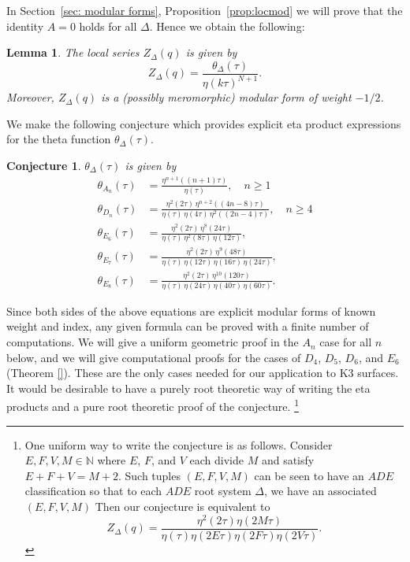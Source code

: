 \documentclass{article}
\newtheorem{conjecture}[theorem]{Conjecture}
\newtheorem{lemma}[theorem]{Lemma}
\theoremstyle{definition}
\newcommand{\NN} {{\mathbb N}}		%
\begin{document}
In Section~\ref{sec: modular forms}, Proposition~\ref{prop:locmod} we will prove that the identity $A=0$ holds
for all $\Delta$. Hence we obtain the following:
\begin{lemma}\label{lem: local series as theta/eta} The local series
$Z_{\Delta}(q)$ is given by
\[
Z_{\Delta}(q) = \frac{\theta_{\Delta}(\tau )}{\eta (k\tau )^{N+1}}. 
\]
Moreover, $Z_{\Delta}(q)$  is a (possibly meromorphic) modular form of weight $-1/2$.
\end{lemma}
We make the following conjecture which provides explicit eta product expressions for the theta function $\theta_{\Delta}(\tau )$.

\begin{conjecture}\label{conj: eta product for theta function}
$\theta_{\Delta}(\tau )$ is given by
\begin{align}\label{eqn: theta function eta products}
\theta_{A_{n}}(\tau ) &= \frac{\eta^{n+1}((n+1)\tau )}{\eta (\tau )} ,\quad n\geq 1\\
\theta_{D_{n}}(\tau ) &= \frac{\eta^{2}(2\tau )\,  \eta^{n+2}((4n-8)\tau )}{\eta (\tau )\,  \eta (4\tau )\,  \eta^{2}((2n-4)\tau )} ,\quad n\geq 4\\
\theta_{E_{6}}(\tau ) & = \frac{\eta^{2}(2\tau )\, \eta^{8}(24\tau
)}{\eta (\tau )\, \eta^{2}(8\tau )\, \eta (12\tau )} ,\\
\theta_{E_{7}}(\tau ) & = \frac{\eta^{2}(2\tau )\, \eta^{9}(48\tau
)}{\eta (\tau )\, \eta(12\tau )\, \eta(16\tau )\, \eta (24\tau )} ,\\
\theta_{E_{8}}(\tau ) & = \frac{\eta^{2}(2\tau )\, \eta^{10}(120\tau
)}{\eta (\tau )\, \eta(24\tau )\, \eta(40\tau )\, \eta (60\tau )}.
\end{align}
\end{conjecture}


Since both sides of the above equations are explicit modular forms of
known weight and index, any given formula can be proved with a finite
number of computations. We will give a uniform geometric proof in the
$A_{n}$ case for all $n$ below, and we will give computational proofs
for the cases of $D_{4}$, $D_{5}$, $D_{6}$, and $E_{6}$ (Theorem
\ref{}). These are the only cases needed for our application to K3
surfaces. It would be desirable to have a purely root theoretic way of
writing the eta products and a pure root theoretic proof of the
conjecture. \footnote{One uniform way to write the conjecture is as
follows. Consider $E,F,V,M\in \NN$ where $E$, $F$, and $V$ each divide
$M$ and satisfy $E+F+V =M+2$. Such tuples $(E,F,V,M)$ can be seen to
have an $ADE$ classification so that to each $ADE$ root system
$\Delta$, we have an associated $(E,F,V,M)$ Then our conjecture is
equivalent to
\[
Z_{\Delta}(q) = \frac{\eta^{2}(2\tau )\eta (2M\tau )}{\eta (\tau )\eta
(2E\tau )\eta (2F\tau )\eta (2V\tau )}. 
\]   }
\end{document}
